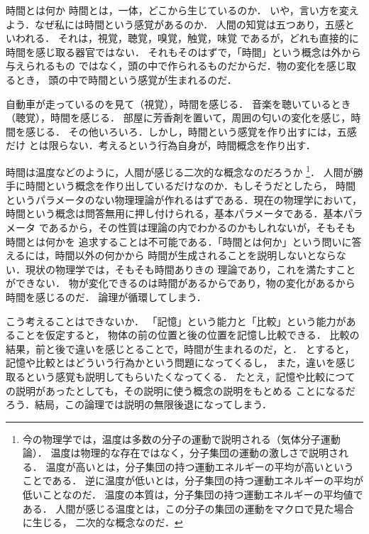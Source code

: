             \begin{memo}{時間とは何か}
                時間とは，一体，どこから生じているのか．
                いや，言い方を変えよう．なぜ私には時間という感覚があるのか．
                人間の知覚は五つあり，五感といわれる．
                それは，視覚，聴覚，嗅覚，触覚，味覚
                であるが，どれも直接的に時間を感じ取る器官ではない．
                それもそのはずで，「時間」という概念は外から与えられるもの
                ではなく，頭の中で作られるものだからだ．物の変化を感じ取るとき，
                頭の中で時間という感覚が生まれるのだ．

                自動車が走っているのを見て（視覚），時間を感じる．
                音楽を聴いているとき（聴覚），時間を感じる．
                部屋に芳香剤を置いて，周囲の匂いの変化を感じ，時間を感じる．
                その他いろいろ．しかし，時間という感覚を作り出すには，五感だけ
                とは限らない．考えるという行為自身が，時間概念を作り出す．

                時間は温度などのように，人間が感じる二次的な概念なのだろうか
                    \footnote{
                        今の物理学では，温度は多数の分子の運動で説明される（気体分子運動論）．
                        温度は物理的な存在ではなく，分子集団の運動の激しさで説明される．
                        温度が高いとは，分子集団の持つ運動エネルギーの平均が高いということである．
                        逆に温度が低いとは，分子集団の持つ運動エネルギーの平均が低いことなのだ．
                        温度の本質は，分子集団の持つ運動エネルギーの平均値である．
                        人間が感じる温度とは，この分子の集団の運動をマクロで見た場合に生じる，
                        二次的な概念なのだ．
                    }．
                人間が勝手に時間という概念を作り出しているだけなのか．もしそうだとしたら，
                時間というパラメータのない物理理論が作れるはずである．現在の物理学において，
                時間という概念は問答無用に押し付けられる，基本パラメータである．基本パラメータ
                であるから，その性質は理論の内でわかるのかもしれないが，そもそも時間とは何かを
                追求することは不可能である．「時間とは何か」という問いに答えるには，時間以外の何かから
                時間が生成されることを説明しないとならない．現状の物理学では，そもそも時間ありきの
                理論であり，これを満たすことができない．
                物が変化できるのは時間があるからであり，物の変化があるから時間を感じるのだ．
                論理が循環してしまう．

                こう考えることはできないか．
               「記憶」という能力と「比較」という能力があることを仮定すると，
                物体の前の位置と後の位置を記憶し比較できる．
                比較の結果，前と後で違いを感じとることで，時間が生まれるのだ，と．
                とすると，記憶や比較とはどういう行為かという問題になってくるし，
                また，違いを感じ取るという感覚も説明してもらいたくなってくる．
                たとえ，記憶や比較につての説明があったとしても，その説明に使う概念の説明をもとめる
                ことになるだろう．結局，この論理では説明の無限後退になってしまう．


\end{memo}
